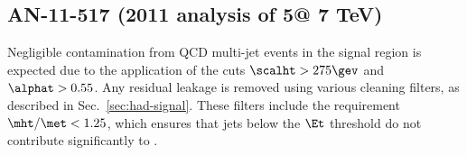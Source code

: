 

\clearpage
\subsection{AN-11-517 (2011 analysis of 5\fbinv @ 7 TeV)}

Negligible contamination from QCD multi-jet events in the signal
region is expected due to the application of the cuts $\scalht >
275\gev$ and $\alphat > 0.55$. Any residual leakage is removed using
various cleaning filters, as described in
Sec.~\ref{sec:had-signal}. These filters include the requirement
$\mht/\met < 1.25$, which ensures that jets below the $\Et$ threshold
do not contribute significantly to \mht.

